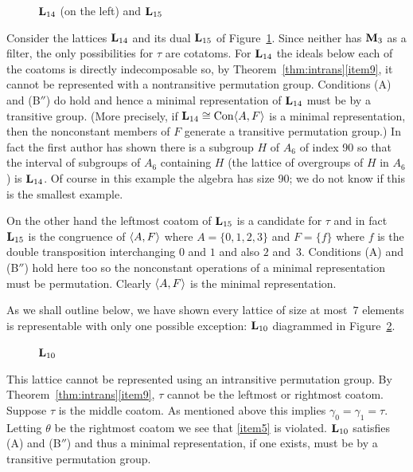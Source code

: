 \begin{figure}[htb]
\begin{center}
  \hskip15mm
\end{center}
\caption{$\mathbf{L}_{14}$ (on the left) and $\mathbf{L}_{15}$}\label{fig:L14and15}
\end{figure}


Consider the lattices $\mathbf{L}_{14}$ and its dual $\mathbf{L}_{15}$ 
of Figure~\ref{fig:L14and15}. Since neither
has $\mathbf{M}_3$ as a filter, the only possibilities for $\tau$ are cotatoms. 
For $\mathbf{L}_{14}$ the ideals below each of the coatoms is directly 
indecomposable so, by Theorem~\ref{thm:intrans}\eqref{item9}, 
it cannot be represented with a nontransitive permutation group. Conditions
(A) and (B$''$) do hold and hence a minimal representation of 
$\mathbf{L}_{14}$ must be by a transitive group. (More precisely, if
$\mathbf{L}_{14} \cong \operatorname{Con} \langle A,F\rangle$ is a minimal representation, 
then the nonconstant members of $F$ generate 
a transitive permutation group.) In fact the first author 
has shown there is a 
subgroup $H$ of $A_6$ of index 90 so that the interval of subgroups of
$A_6$ containing $H$ (the lattice of overgroups of $H$ in $A_6$) is $\mathbf{L}_{14}$.
Of course in this example the algebra has size 90; we do not
know if this is the smallest example.

On the other hand the leftmost coatom of $\mathbf{L}_{15}$ is a candidate for 
$\tau$ and in fact $\mathbf{L}_{15}$ is the congruence of
$\langle A,F\rangle$ where $A = \{0,1,2,3\}$ and $F = \{f\}$ where $f$ is the double
transposition interchanging $0$ and $1$ and also $2$ and~$3$. 
Conditions (A) and (B$''$) hold here too so the nonconstant operations of a 
minimal representation must be permutation. Clearly $\langle A,F\rangle$ is the minimal
representation.

As we shall outline below, we have shown every lattice of size at most~$7$
elements
is representable with only one possible exception: $\mathbf{L}_{10}$ diagrammed 
in Figure~\ref{fig:L10}.

\begin{figure}[htb]
\begin{center}
\end{center}
\caption{$\mathbf{L}_{10}$}\label{fig:L10}
\end{figure}

This lattice cannot be represented using an intransitive permutation group. 
By Theorem~\ref{thm:intrans}\eqref{item9}, $\tau$ cannot be the leftmost or rightmost
coatom. Suppose $\tau$ is the middle coatom.  
As mentioned above this implies
$\gamma_0 = \gamma_1 = \tau$. Letting $\theta$ be the rightmost coatom we 
see that \eqref{item5} is violated. 
$\mathbf{L}_{10}$ satisfies (A) and (B$''$) and thus a minimal representation, if one 
exists, must be by a transitive permutation group.

